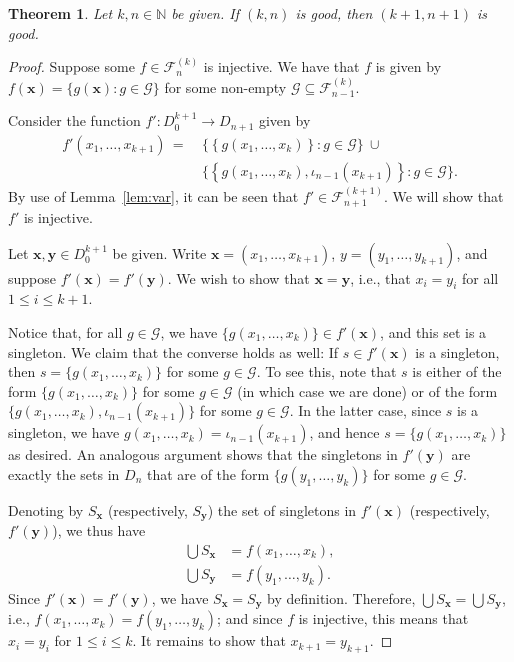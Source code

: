 \documentclass[a4paper,12pt]{article}
\newtheorem{theorem}{Theorem}[section]
\theoremstyle{definition}
\theoremstyle{remark}
\newcommand{\fset}[2]{\mathcal F^{(#1)}_{#2}}
\newcommand{\N}{\mathbb N}
\begin{document}
\begin{theorem}\label{thm:diag}
    Let $k, n \in \N$ be given. If $(k, n)$ is good, then $(k+1, n+1)$ is good.
\end{theorem}
\begin{proof}
    Suppose some $f \in \fset kn$ is injective. We have that $f$ is given by $f(\mathbf x) = \{g(\mathbf x) : g \in \mathcal G\}$ for some non-empty $\mathcal G \subseteq \fset k{n-1}$.

    Consider the function $f' : D_0^{k+1} \to D_{n+1}$ given by
    \begin{align*}
        f'(x_1, \dots, x_{k+1})\,=\ &\big\{\left\{g(x_1, \dots, x_k)\right\} : g \in \mathcal G\big\}\ \cup\\
        &\big\{\left\{g(x_1, \dots, x_k), \iota_{n-1}(x_{k+1})\right\} : g \in \mathcal G \big\}.
    \end{align*}
    By use of Lemma~\ref{lem:var}, it can be seen that $f' \in \fset {k+1}{n+1}$. We will show that $f'$ is injective.

    Let $\mathbf x, \mathbf y \in D_0^{k+1}$ be given. Write $\mathbf x = (x_1, \dots, x_{k+1})$, $y = (y_1, \dots, y_{k+1})$, and suppose $f'(\mathbf x) = f'(\mathbf y)$. We wish to show that $\mathbf x = \mathbf y$, i.e., that $x_i = y_i$ for all $1 \leq i \leq k+1$.

    Notice that, for all $g \in \mathcal G$, we have $\{g(x_1, \dots, x_k)\} \in f'(\mathbf x)$, and this set is a singleton. We claim that the converse holds as well: If $s \in f'(\mathbf x)$ is a singleton, then $s = \{g(x_1, \dots, x_k)\}$ for some $g \in \mathcal G$. To see this, note that $s$ is either of the form $\{g(x_1, \dots, x_k)\}$ for some $g \in \mathcal G$ (in which case we are done) or of the form $\{g(x_1, \dots, x_k), \iota_{n-1}(x_{k+1})\}$ for some $g \in \mathcal G$. In the latter case, since $s$ is a singleton, we have $g(x_1, \dots, x_k) = \iota_{n-1}(x_{k+1})$, and hence $s = \{g(x_1, \dots, x_k)\}$ as desired. An analogous argument shows that the singletons in $f'(\mathbf y)$ are exactly the sets in $D_n$ that are of the form $\{g(y_1, \dots, y_k)\}$ for some $g \in \mathcal G$.

    Denoting by $S_{\mathbf x}$ (respectively, $S_{\mathbf y}$) the set of singletons in $f'(\mathbf x)$ (respectively, $f'(\mathbf y)$), we thus have
    \begin{align*}
        \bigcup S_{\mathbf x} &= f(x_1, \dots, x_k),\\
        \bigcup S_{\mathbf y} &= f(y_1, \dots, y_k).
    \end{align*}
    Since $f'(\mathbf x) = f'(\mathbf y)$, we have $S_{\mathbf x} = S_{\mathbf y}$ by definition. Therefore, $\bigcup S_{\mathbf x} = \bigcup S_{\mathbf y}$, i.e., $f(x_1, \dots, x_k) = f(y_1, \dots, y_k)$; and since $f$ is injective, this means that $x_i = y_i$ for $1 \leq i \leq k$. It remains to show that $x_{k+1} = y_{k+1}$.


\end{proof}
\end{document}
